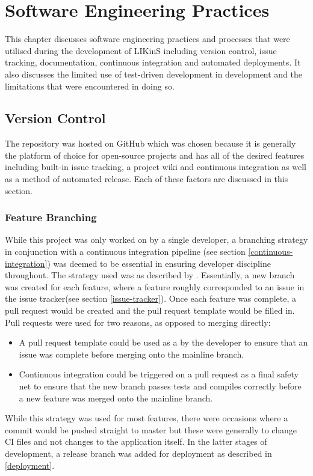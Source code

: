 \documentclass{l4proj}
\begin{document}
\chapter{Software Engineering Practices}
This chapter discusses software engineering practices and processes that were utilised during the development of LIKinS including version control, issue tracking, documentation, continuous integration and automated deployments. It also discusses the limited use of test-driven development in development and the limitations that were encountered in doing so.

\section{Version Control}
The repository was hosted on GitHub \citep{GitHub:online} which was chosen because it is generally the platform of choice for open-source projects and has all of the desired features including built-in issue tracking, a project wiki and continuous integration as well as a method of automated release. Each of these factors are discussed in this section.


\subsection{Feature Branching}
While this project was only worked on by a single developer, a branching strategy in conjunction with a continuous integration pipeline (see section \ref{continuous-integration}) was deemed to be essential in ensuring developer discipline throughout. The strategy used was  as described by \cite{fowler_2020}. Essentially, a new branch was created for each feature, where a feature roughly corresponded to an issue in the issue tracker(see section \ref{issue-tracker}). Once each feature was complete, a pull request would be created and the pull request template would be filled in. Pull requests were used for two reasons, as opposed to merging directly: \begin{itemize}
    \item A pull request template could be used as a  by the developer to ensure that an issue was complete before merging onto the mainline branch.
    \item Continuous integration could be triggered on a pull request as a final safety net to ensure that the new branch passes tests and compiles correctly before a new feature was merged onto the mainline branch.
\end{itemize}
While this strategy was used for most features, there were occasions where a commit would be pushed straight to master but these were generally to change CI files and not changes to the application itself. In the latter stages of development, a release branch was added for deployment as described in \ref{deployment}.
\end{document}
